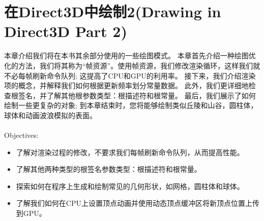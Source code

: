 \chapter{在Direct3D中绘制2(Drawing in Direct3D Part 2)}
\begin{flushleft}
本章介绍我们将在本书其余部分使用的一些绘图模式。 本章首先介绍一种绘图优化的方法，我们将其称为“帧资源”。使用帧资源，我们修改渲染循环，这样我们就不必每帧刷新命令队列; 这提高了CPU和GPU的利用率。 接下来，我们介绍渲染项的概念，并解释我们如何根据更新频率划分常量数据。 此外，我们更详细地检查根签名，并了解其他根参数类型：根描述符和根常量。 最后，我们展示了如何绘制一些更复杂的对象; 到本章结束时，您将能够绘制类似丘陵和山谷，圆柱体，球体和动画波浪模拟的表面。\\
~\\
{\large Objectives:}
\begin{itemize}
    \item 了解对渲染过程的修改，不要求我们每帧刷新命令队列，从而提高性能。
    \item 了解其他两种类型的根签名参数类型：根描述符和根常量。
    \item 探索如何在程序上生成和绘制常见的几何形状，如网格，圆柱体和球体。
    \item 了解我们如何在CPU上设置顶点动画并使用动态顶点缓冲区将新顶点位置上传到GPU。
\end{itemize}
\end{flushleft}

